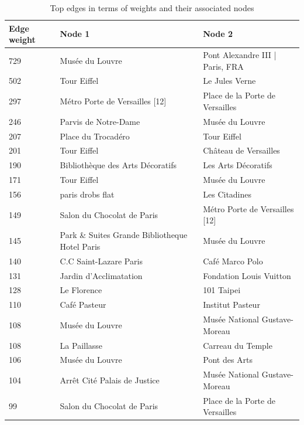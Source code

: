 \begin{table}
  \begin{tabularx}{\textwidth}{| X | X | X |}
    \hline
    \textbf{Edge weight} & \textbf{Node 1} & \textbf{Node 2} \\ \hline
    729 & Musée du Louvre & Pont Alexandre III | Paris, FRA \\ \hline
    502 & Tour Eiffel & Le Jules Verne \\ \hline
    297 & Métro Porte de Versailles [12] & Place de la Porte de Versailles \\ \hline
    246 & Parvis de Notre-Dame & Musée du Louvre \\ \hline
    207 & Place du Trocadéro & Tour Eiffel \\ \hline
    201 & Tour Eiffel & Château de Versailles \\ \hline
    190 & Bibliothèque des Arts Décoratifs & Les Arts Décoratifs \\ \hline
    171 & Tour Eiffel & Musée du Louvre \\ \hline
    156 & paris drobs flat & Les Citadines \\ \hline
    149 & Salon du Chocolat de Paris & Métro Porte de Versailles [12] \\ \hline
    145 & Park \& Suites Grande Bibliotheque Hotel Paris & Musée du Louvre \\ \hline
    140 & C.C Saint-Lazare Paris & Café Marco Polo \\ \hline
    131 & Jardin d'Acclimatation & Fondation Louis Vuitton \\ \hline
    128 & Le Florence & 101 Taipei \\ \hline
    110 & Café Pasteur & Institut Pasteur \\ \hline
    108 & Musée du Louvre & Musée National Gustave-Moreau \\ \hline
    108 & La Paillasse & Carreau du Temple \\ \hline
    106 & Musée du Louvre & Pont des Arts \\ \hline
    104 & Arrêt Cité Palais de Justice & Musée National Gustave-Moreau \\ \hline
    99 & Salon du Chocolat de Paris & Place de la Porte de Versailles \\ \hline
    \hline
  \end{tabularx}
  \caption{Top edges in terms of weights and their associated nodes}
  \label{table:edges}
\end{table}

